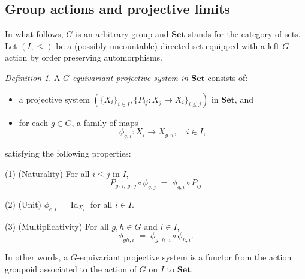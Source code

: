 \documentclass[11pt,reqno]{amsart}
\numberwithin{equation}{section}
\theoremstyle{remark}
\theoremstyle{rmdefinition}
\newtheorem{definition}[theorem]{Definition}
\DeclareMathOperator{\Id}{Id}
\begin{document}
\subsection{Group actions and projective limits}
In what follows, $G$ is an arbitrary group and $\mathbf{Set}$ stands for the category of sets. Let  $(I, \leq)$ be a (possibly uncountable) directed set equipped with a left $G$-action by order preserving automorphisms.
\begin{definition}\label{euqiprojde}
 A \emph{$G$-equivariant projective system in $\mathbf{Set}$} consists of:
\begin{itemize}
	\item a projective system $(\{X_i\}_{i\in I},\{P_{ij}:X_j\to X_i\}_{i\le j})$ in $\mathbf{Set}$, and
	\item for each $g\in G$, a family of maps
	\[
	\phi_{g,i}: X_i \rightarrow X_{g\cdot i},\quad i\in I,
	\]
\end{itemize}
	satisfying the following properties:
	
	(1) (Naturality) For all $i\le j$ in $I$,
		\begin{equation*}
			P_{g\cdot i,\,g\cdot j}\circ \phi_{g,j}
			\;=\;
			\phi_{g,i}\circ P_{ij}
		\end{equation*}
		
	(2) (Unit) $\phi_{e,i}=\Id_{X_i}$ for all $i\in I$.
		
	(3) (Multiplicativity) For all $g,h\in G$ and $i\in I$,
		\begin{equation*}
			\phi_{gh,i} \;=\; \phi_{g,\,h\cdot i}\circ \phi_{h,i}.
		\end{equation*}
\end{definition}
In other words, a $G$-equivariant projective system is a functor from the action groupoid associated to the action of $G$ on $I$ to $\mathbf{Set}$.
\end{document}
